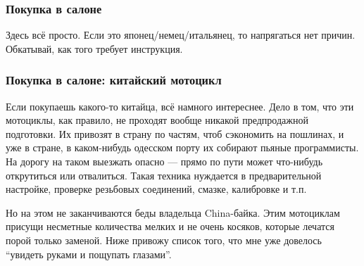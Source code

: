 \documentclass[12pt,a4paper]{article}
\begin{document}
\subsubsection{Покупка в салоне}

Здесь всё просто. Если это японец/немец/итальянец, то напрягаться
нет причин. Обкатывай, как того требует инструкция.

\subsubsection{Покупка в салоне: китайский мотоцикл}

Если покупаешь какого-то китайца, всё намного интереснее. Дело в
том, что эти мотоциклы, как правило, не проходят вообще никакой
предпродажной подготовки. Их привозят в страну по частям, чтоб
сэкономить на пошлинах, и уже в стране, в каком-нибудь одесском
порту их собирают пьяные программисты. На дорогу на таком выезжать
опасно --- прямо по пути может что-нибудь открутиться или отвалиться.
Такая техника нуждается в предварительной настройке, проверке резьбовых
соединений, смазке, калибровке и т.п.

Но на этом не заканчиваются беды владельца China-байка. Этим
мотоциклам присущи несметные количества мелких и не очень косяков,
которые лечатся порой только заменой. Ниже привожу список того,
что мне уже довелось ``увидеть руками и пощупать глазами''.
\end{document}
